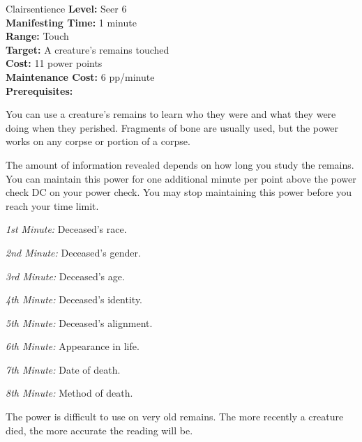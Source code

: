 {Clairsentience}
{
	\textbf{Level:}
	Seer 6\\
	\textbf{Manifesting Time:}
	1 minute\\
	\textbf{Range:}
	Touch\\
	\textbf{Target:}
	A creature's remains touched\\
	\textbf{Cost:}
	11 power points\\
	\textbf{Maintenance Cost:}
	6 pp/minute\\
	\textbf{Prerequisites:}
	\\
}
{
	You can use a creature's remains to learn who they were and what they were doing when they perished. Fragments of bone are usually used, but the power works on any corpse or portion of a corpse.

	The amount of information revealed depends on how long you study the remains. You can maintain this power for one additional minute per point above the power check DC on your power check. You may stop maintaining this power before you reach your time limit.

	\textit{1st Minute:} Deceased's race.

	\textit{2nd Minute:} Deceased's gender.

	\textit{3rd Minute:} Deceased's age.

	\textit{4th Minute:} Deceased's identity.

	\textit{5th Minute:} Deceased's alignment.

	\textit{6th Minute:} Appearance in life.

	\textit{7th Minute:} Date of death.

	\textit{8th Minute:} Method of death.

	The power is difficult to use on very old remains. The more recently a creature died, the more accurate the reading will be.

}